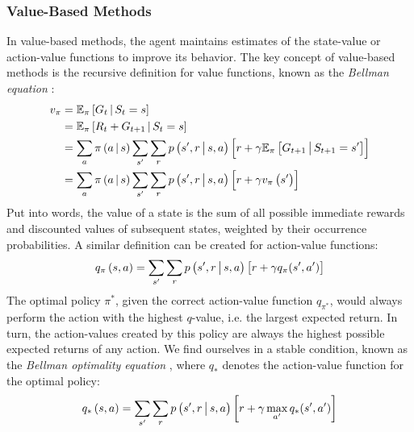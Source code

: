 \subsubsection{Value-Based Methods}
In value-based methods, the agent maintains estimates of the state-value or action-value functions to improve its behavior. The key concept of value-based methods is the recursive definition for value functions, known as the \textit{Bellman equation} \cite{bible}:
\begin{align*}
    v_\pi &= \mathbb{E}_\pi \left[G_t \,\middle|\, S_t = s\right] \\
          &= \mathbb{E}_\pi \left[R_t + G_{t+1} \,\middle|\, S_t = s\right] \\
          &= \sum_a \pi\left(a \,\middle|\, s\right) \sum_{s'} \sum_r p\left(s', r \,\middle|\, s, a\right) \left[r + \gamma \mathbb{E}_\pi\left[G_{t+1} \,\middle|\, S_{t+1} = s'\right]\right] \\
          &= \sum_a \pi\left(a \,\middle|\, s\right) \sum_{s'} \sum_r p\left(s', r \,\middle|\, s, a\right) \left[r + \gamma v_\pi\left(s'\right)\right]
\end{align*}
Put into words, the value of a state is the sum of all possible immediate rewards and discounted values of subsequent states, weighted by their occurrence probabilities. A similar definition can be created for action-value functions:
\begin{equation*}
    q_\pi\left(s, a\right) = \sum_{s'} \sum_r p\left(s', r \,\middle|\, s, a\right) \left[r + \gamma q_\pi(s', a')\right]
\end{equation*}
The optimal policy $\pi^*$, given the correct action-value function $q_{\pi^*}$, would always perform the action with the highest $q$-value, i.e. the largest expected return. In turn, the action-values created by this policy are always the highest possible expected returns of any action. We find ourselves in a stable condition, known as the \textit{Bellman optimality equation} \cite{bible}, where $q_*$ denotes the action-value function for the optimal policy:
\begin{equation*}
    q_*\left(s, a\right) = \sum_{s'} \sum_r p\left(s', r \,\middle|\, s, a\right) \left[r + \gamma \max_{a'} q_*(s', a')\right]
\end{equation*}

